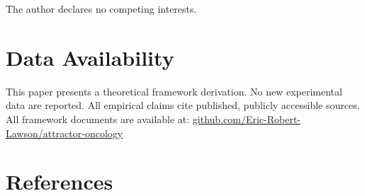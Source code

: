 \documentclass[12pt,a4paper]{article}
\begin{document}
The author declares no competing interests.

\section*{Data Availability}

This paper presents a theoretical framework derivation. No new experimental
data are reported. All empirical claims cite published, publicly accessible
sources. All framework documents are available at:
\href{https://github.com/Eric-Robert-Lawson/attractor-oncology}{github.com/Eric-Robert-Lawson/attractor-oncology}

\section*{References}
\end{document}
